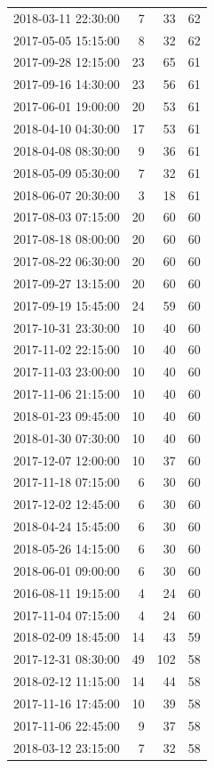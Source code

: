 \begin{tabular}{lrrr}
2018-03-11 22:30:00 & 7 & 33 & 62 \\
2017-05-05 15:15:00 & 8 & 32 & 62 \\
2017-09-28 12:15:00 & 23 & 65 & 61 \\
2017-09-16 14:30:00 & 23 & 56 & 61 \\
2017-06-01 19:00:00 & 20 & 53 & 61 \\
2018-04-10 04:30:00 & 17 & 53 & 61 \\
2018-04-08 08:30:00 & 9 & 36 & 61 \\
2018-05-09 05:30:00 & 7 & 32 & 61 \\
2018-06-07 20:30:00 & 3 & 18 & 61 \\
2017-08-03 07:15:00 & 20 & 60 & 60 \\
2017-08-18 08:00:00 & 20 & 60 & 60 \\
2017-08-22 06:30:00 & 20 & 60 & 60 \\
2017-09-27 13:15:00 & 20 & 60 & 60 \\
2017-09-19 15:45:00 & 24 & 59 & 60 \\
2017-10-31 23:30:00 & 10 & 40 & 60 \\
2017-11-02 22:15:00 & 10 & 40 & 60 \\
2017-11-03 23:00:00 & 10 & 40 & 60 \\
2017-11-06 21:15:00 & 10 & 40 & 60 \\
2018-01-23 09:45:00 & 10 & 40 & 60 \\
2018-01-30 07:30:00 & 10 & 40 & 60 \\
2017-12-07 12:00:00 & 10 & 37 & 60 \\
2017-11-18 07:15:00 & 6 & 30 & 60 \\
2017-12-02 12:45:00 & 6 & 30 & 60 \\
2018-04-24 15:45:00 & 6 & 30 & 60 \\
2018-05-26 14:15:00 & 6 & 30 & 60 \\
2018-06-01 09:00:00 & 6 & 30 & 60 \\
2016-08-11 19:15:00 & 4 & 24 & 60 \\
2017-11-04 07:15:00 & 4 & 24 & 60 \\
2018-02-09 18:45:00 & 14 & 43 & 59 \\
2017-12-31 08:30:00 & 49 & 102 & 58 \\
2018-02-12 11:15:00 & 14 & 44 & 58 \\
2017-11-16 17:45:00 & 10 & 39 & 58 \\
2017-11-06 22:45:00 & 9 & 37 & 58 \\
2018-03-12 23:15:00 & 7 & 32 & 58 \\

\end{tabular}
